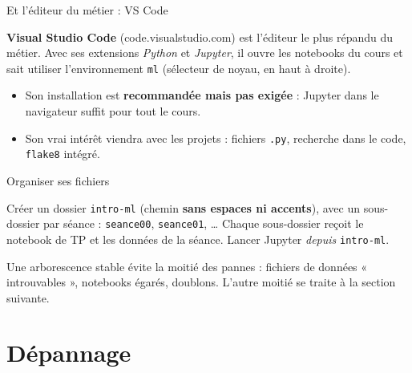 \documentclass[aspectratio=169,11pt]{beamer}
\begin{document}
\begin{frame}{Et l'éditeur du métier : VS Code}
\begin{ucadfront}
{\small \textbf{Visual Studio Code} (code.visualstudio.com) est l'éditeur le plus répandu du métier. Avec ses extensions \emph{Python} et \emph{Jupyter}, il ouvre les notebooks du cours et sait utiliser l'environnement \texttt{ml} (sélecteur de noyau, en haut à droite).}
\end{ucadfront}
\begin{itemize}\small
  \item Son installation est \textbf{recommandée mais pas exigée} : Jupyter dans le navigateur suffit pour tout le cours.
  \item Son vrai intérêt viendra avec les projets : fichiers \texttt{.py}, recherche dans le code, \texttt{flake8} intégré.
\end{itemize}
\end{frame}

\begin{frame}{Organiser ses fichiers}
\begin{ucadret}
{\small Créer un dossier \texttt{intro-ml} (chemin \textbf{sans espaces ni accents}), avec un sous-dossier par séance : \texttt{seance00}, \texttt{seance01}, \dots{} Chaque sous-dossier reçoit le notebook de TP et les données de la séance. Lancer Jupyter \emph{depuis} \texttt{intro-ml}.}
\end{ucadret}
{\small Une arborescence stable évite la moitié des pannes : fichiers de données « introuvables », notebooks égarés, doublons. L'autre moitié se traite à la section suivante.}
\end{frame}

\section{Dépannage}
\end{document}
